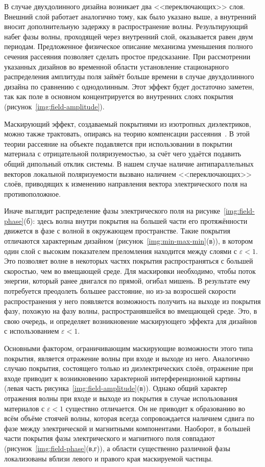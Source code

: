 В случае двухдолинного дизайна возникает два <<переключающих>> слоя.
Внешний слой работает аналогично тому, как было указано выше, а
внутренний вносит дополнительную задержку в распространение
волны. Результирующий набег фазы волны, проходящей через внутренний
слой, оказывается равен двум периодам.  Предложенное физическое
описание механизма уменьшения полного сечения рассеяния позволяет
сделать простое предсказание.  При рассмотрении указанных дизайнов во
временной области установление стационарного распределения амплитуды
поля займёт больше времени в случае
двухдолинного дизайна по сравнению с однодолинным. Этот эффект будет
достаточно заметен, так как поле в основном концентрируется во
внутренних слоях покрытия (рисунок~\ref{img:field-amplitude}).

Маскирующий эффект, создаваемый покрытиями из изотропных диэлектриков,
можно также трактовать, опираясь на теорию компенсации
рассеяния~\cite{Alu-2005, alu}.  В этой теории рассеяние на объекте
подавляется при использовании в покрытии материала с отрицательной
поляризуемостью, за счёт чего удаётся подавить общий дипольный отклик
системы. В нашем случае наличие антипараллельных векторов локальной
поляризуемости вызвано наличием <<переключающих>> слоёв, приводящих к
изменению направления вектора электрического поля на противоположное.

Иначе выглядит распределение фазы электрического поля на
рисунке~\ref{img:field-phase}(б): здесь волна внутри покрытия на
большей части его протяжённости движется в фазе с волной в окружающем
пространстве.  Такие покрытия отличаются характерным дизайном
(рисунок~\ref{img:min-max-min}(в)), в котором один слой с высоким
показателем преломления находится между слоями с
${\varepsilon<1}$. Это позволяет волне в некоторых частях покрытия распространяться
с большей скоростью, чем во вмещающей среде. Для маскировки
необходимо, чтобы поток энергии, который ранее двигался по прямой,
огибал мишень. В результате ему потребуется преодолеть большее
расстояние, но из-за возросшей скорости распространения у него
появляется возможность получить на выходе из покрытия фазу, похожую на
фазу волны, распространявшейся во вмещающей среде. Это, в свою
очередь, и определяет возникновение маскирующего эффекта для дизайнов
с использованием ${\varepsilon<1}$.

Основными фактором, ограничивающим маскирующие возможности этого типа
покрытия, является отражение волны при входе и выходе из него.
Аналогично случаю покрытия, состоящего только из диэлектрических
слоёв, отражение при входе приводит к возникновению характерной
интерференционной картины (левая часть
рисунка~\ref{img:field-amplitude}(в)). Однако общий характер отражения
волны при входе и выходе из покрытия в случае использования материалов
с ${\varepsilon<1}$ существно отличается. Он не приводит к образованию
во всём объёме стоячей волны, которая всегда сопровождается наличием
сдвига по фазе между электрической и магнитными
компонентами. Наоборот, в большей части покрытия фазы электрического и
магнитного поля совпадают (рисунок~\ref{img:field-phase}(в,г)), а
области существенно различной фазы локализованы вблизи левого и
правого края маскируемой частицы.

